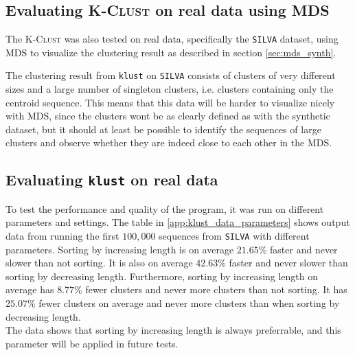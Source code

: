 

\subsection{Evaluating \textsc{K-Clust} on real data using MDS}

The \textsc{K-Clust} was also tested on real data, specifically the
\texttt{SILVA} dataset, using MDS to visualize the clustering result as
described in section \ref{sec:mds_synth}.

The clustering result from \texttt{klust} on \texttt{SILVA} consists of
clusters of very different sizes and a large number of singleton clusters, i.e.
clusters containing only the centroid sequence. This means that this data will
be harder to visualize nicely with MDS, since the clusters wont be as clearly
defined as with the synthetic dataset, but it should at least be possible to
identify the sequences of large clusters and observe whether they are indeed
close to each other in the MDS.


\subsection{Evaluating \texttt{klust} on real data}



To test the performance and quality of the program, it was run on different
parameters and settings. The table in \ref{app:klust_data_parameters} shows
output data from running the first $100,000$ sequences from \texttt{SILVA}
with different parameters. Sorting by increasing length is on average
$21.65\%$ faster and never slower than not sorting. It is also on average
$42.63\%$ faster and never slower than sorting by decreasing length.
Furthermore, sorting by increasing length on average has $8.77\%$ fewer
clusters and never more clusters than not sorting. It has $25.07\%$ fewer
clusters on average and never more clusters than when sorting by decreasing
length. \\ 
The data shows that sorting by increasing length is always preferrable, and this parameter will be applied in future tests.

